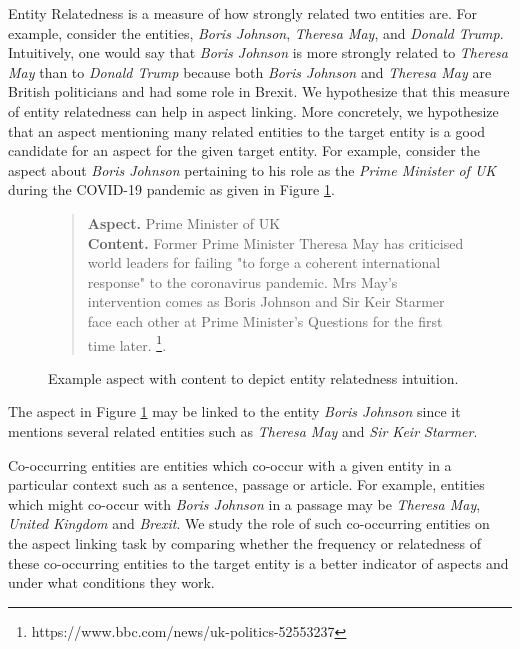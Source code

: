 Entity Relatedness is a measure of how strongly related two entities are. For example, consider the entities, \textit{Boris Johnson}, \textit{Theresa May}, and \textit{Donald Trump}. Intuitively, one would say that \textit{Boris Johnson} is more strongly related to \textit{Theresa May} than to \textit{Donald Trump} because both \textit{Boris Johnson} and \textit{Theresa May} are British politicians and had some role in Brexit. We hypothesize that this measure of entity relatedness can help in aspect linking. More concretely, we hypothesize that an aspect mentioning many related entities to the target entity  is a good candidate for an aspect for the given target entity. For example, consider the aspect about \textit{Boris Johnson} pertaining to his role as the \textit{Prime Minister of UK} during the COVID-19 pandemic as given in Figure \ref{fig:relatedness-example}.

\begin{figure}[t]
    \centering
    \begin{quote}
        \textbf{Aspect.} Prime Minister of UK \\
        \textbf{Content.}
         Former Prime Minister Theresa May has criticised world leaders for failing "to forge a coherent international response" to the coronavirus pandemic. Mrs May's intervention comes as Boris Johnson and Sir Keir Starmer face each other at Prime Minister's Questions for the first time later. \footnote{https://www.bbc.com/news/uk-politics-52553237}.
    \end{quote}
    \caption{Example aspect with content to depict entity relatedness intuition.}
    \label{fig:relatedness-example}
\end{figure}

The aspect in Figure \ref{fig:relatedness-example} may be linked to the entity \textit{Boris Johnson} since it mentions several related entities such as \textit{Theresa May} and \textit{Sir Keir Starmer}. 


Co-occurring entities are entities which co-occur with a given entity in a particular context such as a sentence, passage or article. For example, entities which might co-occur with \textit{Boris Johnson} in a passage may be \textit{Theresa May}, \textit{United Kingdom} and \textit{Brexit}. We study the role of such co-occurring entities on the aspect linking task by comparing whether the frequency or relatedness of these co-occurring entities to the target entity is a better indicator of aspects and under what conditions they work. 


